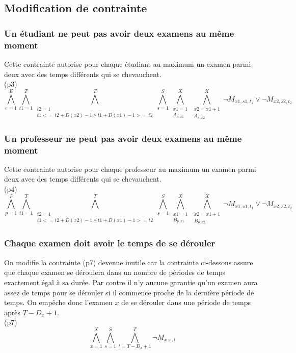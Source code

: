 \documentclass[a4paper,11pt]{article}
\begin{document}
\subsection{Modification de contrainte}

\subsubsection{Un étudiant ne peut pas avoir deux examens au même moment}
Cette contrainte autorise pour chaque étudiant au maximum un examen parmi deux avec des temps différents qui se chevauchent.\\
(p3)
\begin{displaymath}
\bigwedge\limits_{e=1}^{E}\bigwedge\limits_{t1=1}^{T}\bigwedge\limits_{\substack{t2=1 \\ t1 <= t2 + D(x2)-1 \wedge t1 + D(x1)-1 >= t2}}^{T}\bigwedge\limits_{s=1}^{S}\bigwedge\limits_{\substack{x1=1 \\ A_{e,x1}}}^{X}\bigwedge\limits_{\substack{x2=x1+1 \\ A_{e,x2}}}^{X} \neg M_{x1, s1, t_{1}} \vee \neg M_{x2, s2, t_{2}}
\end{displaymath}

\subsubsection{Un professeur ne peut pas avoir deux examens au même moment}
Cette contrainte autorise pour chaque professeur au maximum un examen parmi deux avec des temps différents qui se chevauchent.\\
(p4)
\begin{displaymath}
\bigwedge\limits_{p=1}^{P}\bigwedge\limits_{t1=1}^{T}\bigwedge\limits_{\substack{t2=1 \\ t1 <= t2 + D(x2)-1 \wedge t1 + D(x1)-1 >= t2}}^{T}\bigwedge\limits_{s=1}^{S}\bigwedge\limits_{\substack{x1=1 \\ B_{p,x1}}}^{X}\bigwedge\limits_{\substack{x2=x1+1 \\ B_{p,x2}}}^{X} \neg M_{x1, s1, t_{1}} \vee \neg M_{x2, s2, t_{2}}
\end{displaymath}

\subsubsection{Chaque examen doit avoir le temps de se dérouler}
On modifie la contrainte (p7) devenue inutile car la contrainte ci-dessous assure que chaque examen se déroulera dans un nombre de périodes de temps exactement égal à sa durée. Par contre il n'y aucune garantie qu'un examen aura assez de temps pour se dérouler si il commence proche de la dernière période de temps. On empêche donc l'examen $x$ de se dérouler dans une période de temps après $ T - D_{x} + 1 $.\\
(p7)
\begin{displaymath}
\bigwedge\limits_{x=1}^{X}\bigwedge\limits_{s=1}^{S}\bigwedge\limits_{t=T - D_{x} + 1}^{T} \neg M_{x, s, t}
\end{displaymath}
\end{document}

